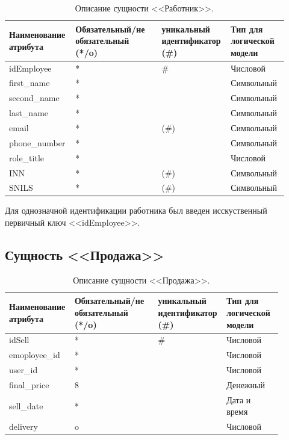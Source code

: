 \documentclass[14pt]{extreport}
\begin{document}
        \begin{table}[H]
            \begin{tabular}{|p{0.225\linewidth}|p{0.3\linewidth}|p{0.2\linewidth}|p{0.2\linewidth}|}
                \hline
                Наименование атрибута & Обязательный/не обязательный (*/o) & уникальный идентификатор (\#) & Тип для логической модели
                \\ \hline
                idEmployee & * & \# & Числовой \\ \hline
                first\_name & * & & Символьный\\ \hline
                second\_name & * & & Символьный\\ \hline
                last\_name & * & & Символьный \\ \hline
                email & * & (\#) & Символьный  \\ \hline
                phone\_number & * & & Символьный\\ \hline
                role\_title & * & & Числовой \\ \hline
                INN & * & (\#) & Символьный \\ \hline
                SNILS & * & (\#) & Символьный \\ \hline 
            \end{tabular}

            \caption{Описание сущности <<Работник>>.}
        \end{table}
        
        Для однозначной идентификации работника был введен исскуственный первичный ключ <<idEmployee>>.


    \subsection*{Сущность <<Продажа>>}

        \begin{table}[H]
            \begin{tabular}{|p{0.2\linewidth}|p{0.3\linewidth}|p{0.2\linewidth}|p{0.2\linewidth}|}
                \hline
                Наименование атрибута & Обязательный/не обязательный (*/o) & уникальный идентификатор (\#) & Тип для логической модели
                \\ \hline
                idSell & * & \# & Числовой \\ \hline
                emoployee\_id & * & & Числовой\\ \hline
                user\_id & * & & Числовой\\ \hline
                final\_price & 8 & & Денежный \\ \hline
                sell\_date & * & & Дата и время \\ \hline  
                delivery & o & & Числовой \\ \hline
            \end{tabular}
            \caption{Описание сущности <<Продажа>>.}
        \end{table}
\end{document}
